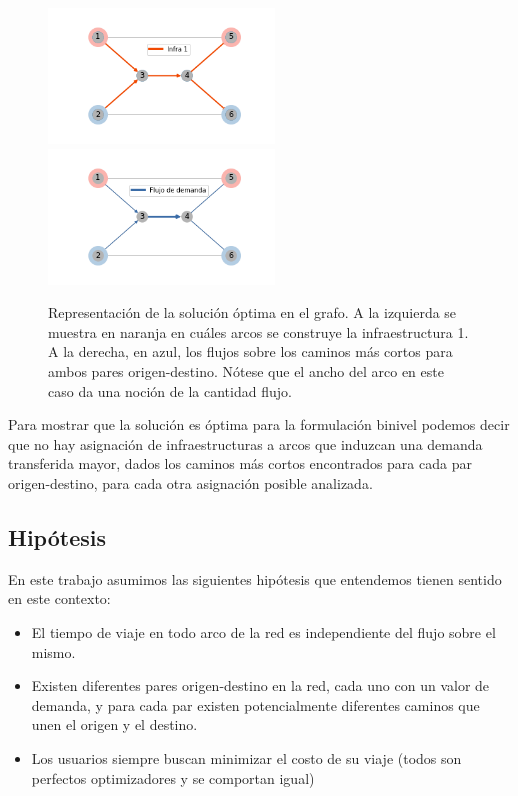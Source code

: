 \documentclass{article}
\begin{document}
  \begin{figure}[h!]
    \centering
    \includegraphics[width=6cm]{../resources/example_1_infras.png}
    \includegraphics[width=6cm]{../resources/example_1_flows.png}
    \caption{Representación de la solución óptima en el grafo. A la izquierda se muestra en naranja en cuáles arcos se construye la infraestructura 1. A la derecha, en azul, los flujos sobre los caminos más cortos para ambos pares origen-destino. Nótese que el ancho del arco en este caso da una noción de la cantidad flujo.}
    \label{fig:example1solution}
  \end{figure}

  Para mostrar que la solución es óptima para la formulación binivel podemos decir que no hay asignación de infraestructuras a arcos que induzcan una demanda transferida mayor, dados los caminos más cortos encontrados para cada par origen-destino, para cada otra asignación posible analizada.

 \FloatBarrier
 \subsection{Hipótesis}

  En este trabajo asumimos las siguientes hipótesis que entendemos tienen sentido en este contexto:

  \begin{itemize}
    \item{El tiempo de viaje en todo arco de la red es independiente del flujo sobre el mismo.}
    \item{Existen diferentes pares origen-destino en la red, cada uno con un valor de demanda, y para cada par existen potencialmente diferentes caminos que unen el origen y el destino.}
    \item{Los usuarios siempre buscan minimizar el costo de su viaje (todos son
    perfectos optimizadores y se comportan igual)}
  \end{itemize}
\end{document}
